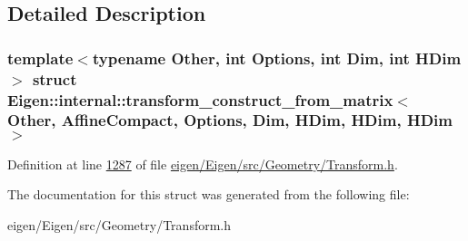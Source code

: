 \subsection{Detailed Description}
\subsubsection*{template$<$typename Other, int Options, int Dim, int H\+Dim$>$\newline
struct Eigen\+::internal\+::transform\+\_\+construct\+\_\+from\+\_\+matrix$<$ Other, Affine\+Compact, Options, Dim, H\+Dim, H\+Dim, H\+Dim $>$}



Definition at line \hyperlink{eigen_2_eigen_2src_2_geometry_2_transform_8h_source_l01287}{1287} of file \hyperlink{eigen_2_eigen_2src_2_geometry_2_transform_8h_source}{eigen/\+Eigen/src/\+Geometry/\+Transform.\+h}.



The documentation for this struct was generated from the following file\+:\begin{DoxyCompactItemize}
\item 
eigen/\+Eigen/src/\+Geometry/\+Transform.\+h\end{DoxyCompactItemize}
